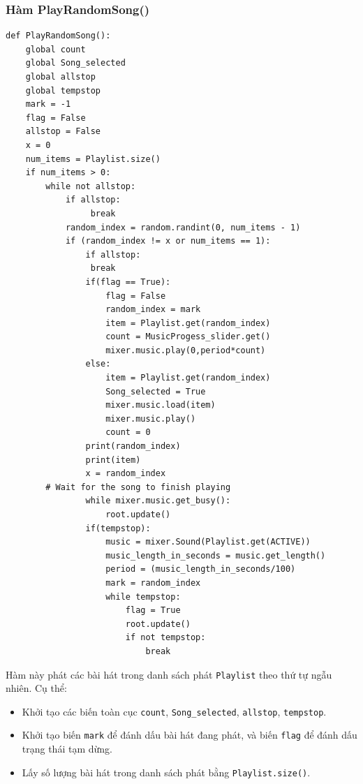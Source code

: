 \documentclass[a4paper]{article}
\begin{document}
\begin{enumerate}
\subsubsection{Hàm PlayRandomSong()}
\begin{mdframed}[hidealllines=true,backgroundcolor=magenta!10]
\begin{lstlisting}
def PlayRandomSong():
    global count
    global Song_selected
    global allstop
    global tempstop
    mark = -1
    flag = False
    allstop = False
    x = 0
    num_items = Playlist.size()
    if num_items > 0:
        while not allstop:
            if allstop:
                 break
            random_index = random.randint(0, num_items - 1)
            if (random_index != x or num_items == 1):
                if allstop:
                 break
                if(flag == True):
                    flag = False
                    random_index = mark
                    item = Playlist.get(random_index)
                    count = MusicProgess_slider.get()
                    mixer.music.play(0,period*count)
                else:
                    item = Playlist.get(random_index)
                    Song_selected = True
                    mixer.music.load(item)
                    mixer.music.play()
                    count = 0
                print(random_index)
                print(item)
                x = random_index
        # Wait for the song to finish playing
                while mixer.music.get_busy():
                    root.update()
                if(tempstop):
                    music = mixer.Sound(Playlist.get(ACTIVE))
                    music_length_in_seconds = music.get_length()
                    period = (music_length_in_seconds/100)
                    mark = random_index
                    while tempstop:
                        flag = True
                        root.update()
                        if not tempstop:
                            break
\end{lstlisting}
\end{mdframed}
Hàm này phát các bài hát trong danh sách phát \texttt{Playlist} theo thứ tự ngẫu nhiên. Cụ thể:
\begin{itemize}
    \item Khởi tạo các biến toàn cục \texttt{count}, \texttt{Song\_selected}, \texttt{allstop}, \texttt{tempstop}.
    \item Khởi tạo biến \texttt{mark} để đánh dấu bài hát đang phát, và biến \texttt{flag} để đánh dấu trạng thái tạm dừng.
    \item Lấy số lượng bài hát trong danh sách phát bằng \texttt{Playlist.size()}.

\end{itemize}
\end{enumerate}
\end{document}
